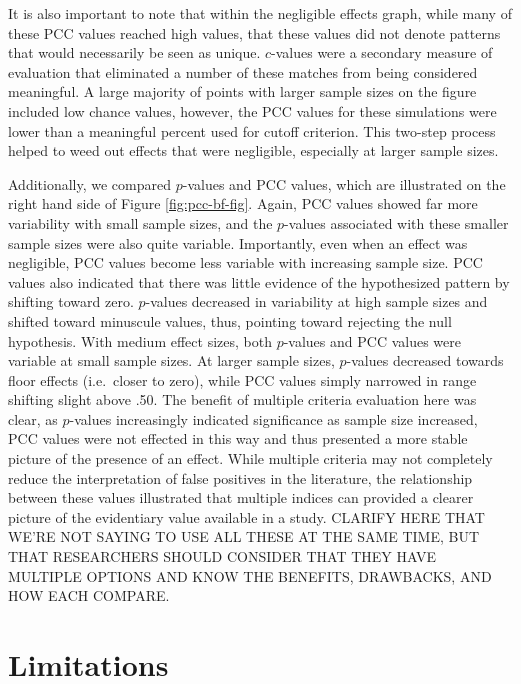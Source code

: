 \documentclass[english,man]{apa6}
\theoremstyle{definition}
\theoremstyle{definition}
\theoremstyle{definition}
\theoremstyle{remark}
\begin{document}
It is also important to note that within the negligible effects graph,
while many of these PCC values reached high values, that these values
did not denote patterns that would necessarily be seen as unique.
\(c\)-values were a secondary measure of evaluation that eliminated a
number of these matches from being considered meaningful. A large
majority of points with larger sample sizes on the figure included low
chance values, however, the PCC values for these simulations were lower
than a meaningful percent used for cutoff criterion. This two-step
process helped to weed out effects that were negligible, especially at
larger sample sizes.

Additionally, we compared \(p\)-values and PCC values, which are
illustrated on the right hand side of Figure \ref{fig:pcc-bf-fig}.
Again, PCC values showed far more variability with small sample sizes,
and the \(p\)-values associated with these smaller sample sizes were
also quite variable. Importantly, even when an effect was negligible,
PCC values become less variable with increasing sample size. PCC values
also indicated that there was little evidence of the hypothesized
pattern by shifting toward zero. \(p\)-values decreased in variability
at high sample sizes and shifted toward minuscule values, thus, pointing
toward rejecting the null hypothesis. With medium effect sizes, both
\(p\)-values and PCC values were variable at small sample sizes. At
larger sample sizes, \(p\)-values decreased towards floor effects
(i.e.~closer to zero), while PCC values simply narrowed in range
shifting slight above .50. The benefit of multiple criteria evaluation
here was clear, as \(p\)-values increasingly indicated significance as
sample size increased, PCC values were not effected in this way and thus
presented a more stable picture of the presence of an effect. While
multiple criteria may not completely reduce the interpretation of false
positives in the literature, the relationship between these values
illustrated that multiple indices can provided a clearer picture of the
evidentiary value available in a study. CLARIFY HERE THAT WE'RE NOT
SAYING TO USE ALL THESE AT THE SAME TIME, BUT THAT RESEARCHERS SHOULD
CONSIDER THAT THEY HAVE MULTIPLE OPTIONS AND KNOW THE BENEFITS,
DRAWBACKS, AND HOW EACH COMPARE.

\section{Limitations}\label{limitations}
\end{document}
